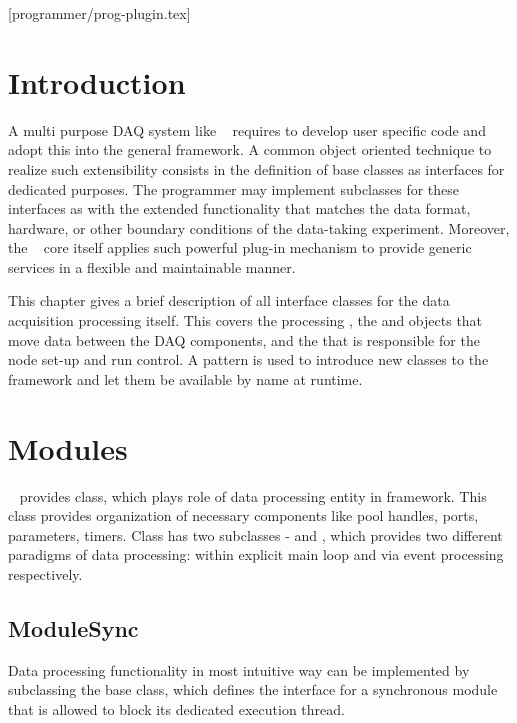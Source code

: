 [programmer/prog-plugin.tex]
\section{Introduction}
A multi purpose DAQ system like \dabc~ requires to develop user specific code and adopt
this into the general framework. A common object oriented technique to realize such
extensibility consists in the definition of base classes as interfaces for dedicated purposes.
The programmer may implement subclasses for these interfaces as 
with the extended functionality that matches the data format, hardware, or other boundary conditions of the
data-taking experiment. Moreover, the  \dabc~ core itself applies such powerful plug-in mechanism to provide 
generic services in a flexible and maintainable manner.   

This chapter gives a brief description of all interface classes for the data acquisition 
processing itself. This covers the processing , the  and 
 objects that move data between the DAQ components, 
and the  that is responsible for the node set-up and run control.
A  pattern is used to introduce new classes to the framework and let them
be available by name at runtime.

\section{Modules}

\dabc~ provides  class, which plays role of data processing entity in framework. 
This class provides organization of necessary components like pool handles, ports, parameters, timers.
Class  has two subclasses -  and ,
which provides two different paradigms of data processing: within explicit main loop and via event processing respectively.

\subsection{ModuleSync}
\label{plugin_module_sync}
Data processing functionality in most intuitive way can be implemented by subclassing 
the  base class, which defines the interface for a 
synchronous module that is allowed to block its dedicated execution thread.  
   
